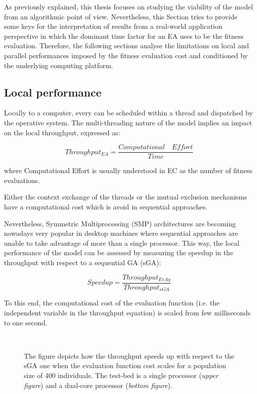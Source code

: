 As previously explained, this thesis focuses on studying the viability of the \evag model from an algorithmic point of view. Nevertheless, this Section tries to provide some keys for the interpretation of results from a real-world application perspective in which the dominant time factor for an EA uses to be the fitness evaluation. Therefore, the following sections analyse the limitations on local and parallel performances imposed by the fitness evaluation cost and conditioned by the underlying computing platform.


\subsection{Local performance}
\label{sec:localperformance}

Locally to a computer, every \evag can be scheduled within a thread and dispatched by the operative system. The multi-threading nature of the model implies an impact on the local throughput, expressed as:

\begin{equation}
Throughput_{EA}=\frac{Computational \quad Effort}{Time}
\label{eq:throughput}
\end{equation}

\noindent where Computational Effort is usually understood in EC as the number of fitness evaluations.

Either the context exchange of the threads or the mutual exclusion mechanisms have a computational cost which is avoid in sequential approaches.

Nevertheless, Symmetric Multiprocessing (SMP) architectures are becoming nowadays very popular in desktop machines where sequential approaches are unable to take advantage of more than a single processor.
This way, the local performance of the \evag model can be assessed by measuring the speedup in the throughput with respect to a sequential GA (sGA):


\begin{equation}
\label{eq:speedup}
Speedup = \frac{Throughput_{EvAg}}{Throughput_{sGA}}
\end{equation}

To this end, the computational cost of the evaluation function (i.e. the independent variable in the throughput equation) is scaled from few milliseconds to one second.


\begin{figure*}[htbp]
\centering
{}\\
\caption{The figure depicts how the \evag throughput speeds up with respect to the sGA one when the evaluation function cost scales for a population size of 400 individuals.
The test-bed is a single processor ({\em upper figure}) and a dual-core processor ({\em bottom figure}).}
\label{fig:sca}
\end{figure*}

